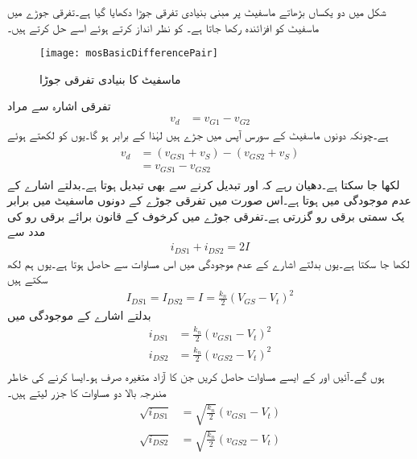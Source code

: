  
شکل  میں دو یکساں بڑھاتے ماسفیٹ پر مبنی بنیادی تفرقی جوڑا دکھایا گیا ہے۔تفرقی جوڑے میں ماسفیٹ کو افزائندہ رکھا جاتا ہے۔ کو نظر انداز کرتے ہوئے اسے حل کرتے ہیں۔
\begin{figure}
\centering
\texttt{[image: mosBasicDifferencePair]}
\caption{ماسفیٹ کا بنیادی تفرقی جوڑا}
\label{شکل_تفرقی_ماسفیٹ_بنیادی_تفرقی_جوڑا}
\end{figure}
تفرقی اشارہ  سے مراد
\begin{align*}
v_d&=v_{G1}-v_{G2}
\end{align*}
ہے۔چونکہ دونوں ماسفیٹ کے سورس  آپس میں جڑے ہیں لہٰذا  کے برابر ہو گا۔یوں  کو  لکھتے ہوئے
\begin{gather}
\begin{aligned}\label{مساوات_تفرقی_اشارے_کی_دوسری_شکل}
v_d&=\left(v_{GS1}+v_S \right)-\left(v_{GS2}+v_S \right)\\
&=v_{GS1}-v_{GS2}
\end{aligned}
\end{gather}
لکھا جا سکتا ہے۔دھیان رہے کہ  اور  تبدیل کرنے سے  بھی تبدیل ہوتا ہے۔بدلتے اشارے کے عدم موجودگی میں  ہوتا ہے۔اس صورت میں تفرقی جوڑے کے دونوں ماسفیٹ میں برابر یک سمتی برقی رو گزرتی ہے۔تفرقی جوڑے میں کرخوف کے قانون برائے برقی رو کی مدد سے
\begin{align}\label{مساوات_تفرقی_دونوں_برقی_رو_کا_مجموعی_قطعی_ہے}
i_{DS1}+i_{DS2}=2I
\end{align}
لکھا جا سکتا ہے۔یوں بدلتے اشارے کے عدم موجودگی  میں اس مساوات سے  حاصل ہوتا ہے۔یوں ہم لکھ سکتے ہیں
\begin{align}\label{مساوات_تفرقی_یکسمتی_برابر_برقی_رو_کی_مساوات}
I_{DS1}=I_{DS2}=I=\frac{k_n}{2} \left(V_{GS}-V_t \right)^2
\end{align}
بدلتے اشارے کے موجودگی میں
\begin{align*}
i_{DS1}&=\frac{k_n}{2}\left(v_{GS1}-V_t \right)^2\\
i_{DS2}&=\frac{k_n}{2}\left(v_{GS2}-V_t \right)^2\\
\end{align*}
ہوں گے۔آئیں  اور  کے ایسے مساوات حاصل کریں جن کا آزاد متغیرہ صرف  ہو۔ایسا کرنے کی خاطر مندرجہ بالا دو مساوات کا  جزر    لیتے ہیں۔
 \begin{align*}
\sqrt{i_{DS1}}&=\sqrt{\frac{k_n}{2}}\left(v_{GS1}-V_t \right)\\
\sqrt{i_{DS2}}&=\sqrt{\frac{k_n}{2}}\left(v_{GS2}-V_t \right)\\
\end{align*}
